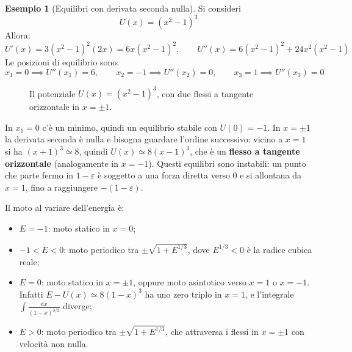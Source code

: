 \documentclass[11pt, a4paper, openright]{book}
\theoremstyle{plain}
\theoremstyle{definition}
\newtheorem{esempio}[teorema]{Esempio}
\theoremstyle{remark}
\begin{document}
\begin{esempio}[Equilibri con derivata seconda nulla]
    Si consideri
    \begin{equation}
        U(x) = (x^2 - 1)^3
    \end{equation}
    Allora:
    \begin{equation}
        U'(x) = 3(x^2 - 1)^2 (2x) = 6x(x^2 - 1)^2, \qquad U''(x) = 6(x^2 - 1)^2 + 24x^2(x^2 - 1)
    \end{equation}
    Le posizioni di equilibrio sono:
    \begin{equation}
        x_1 = 0 \implies U''(x_1) = 6, \qquad x_2 = -1 \implies U''(x_2) = 0, \qquad x_3 = 1 \implies U''(x_3) = 0
    \end{equation}

    \begin{figure}[H]
        \centering
        \caption{Il potenziale $U(x) = (x^2 - 1)^3$, con due flessi a tangente orizzontale in $x = \pm 1$.}
    \end{figure}

    In $x_1 = 0$ c'è un minimo, quindi un equilibrio stabile con $U(0) = -1$. In $x = \pm 1$ la derivata seconda è nulla e bisogna guardare l'ordine successivo: vicino a $x = 1$ si ha $(x + 1)^3 \simeq 8$, quindi $U(x) \simeq 8(x - 1)^3$, che è un \textbf{flesso a tangente orizzontale} (analogamente in $x = -1$). Questi equilibri sono instabili: un punto che parte fermo in $1 - \varepsilon$ è soggetto a una forza diretta verso $0$ e si allontana da $x = 1$, fino a raggiungere $-(1 - \varepsilon)$.

    Il moto al variare dell'energia è:
    \begin{itemize}
        \item $E = -1$: moto statico in $x = 0$;
        \item $-1 < E < 0$: moto periodico tra $\pm\sqrt{1 + E^{1/3}}$, dove $E^{1/3} < 0$ è la radice cubica reale;
        \item $E = 0$: moto statico in $x = \pm 1$, oppure moto asintotico verso $x = 1$ o $x = -1$. Infatti $E - U(x) \simeq 8(1 - x)^3$ ha uno zero triplo in $x = 1$, e l'integrale $\int \frac{\mathrm{d}x}{(1 - x)^{3/2}}$ diverge;
        \item $E > 0$: moto periodico tra $\pm\sqrt{1 + E^{1/3}}$, che attraversa i flessi in $x = \pm 1$ con velocità non nulla.
    \end{itemize}
\end{esempio}
\end{document}
